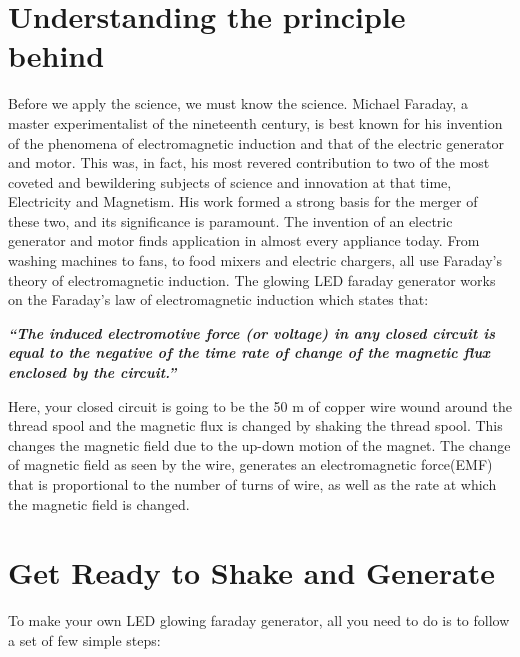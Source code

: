 \section{Understanding the principle behind}
Before we apply the science, we must know the science. Michael Faraday, a
master experimentalist of the nineteenth century, is best known for his invention of the phenomena of electromagnetic induction and that of the electric
generator and motor. This was, in fact, his most revered contribution to two
of the most coveted and bewildering subjects of science and innovation at
that time, Electricity and Magnetism. His work formed a strong basis for the
merger of these two, and its significance is paramount. The invention of an
electric generator and motor finds application in almost every appliance today.
From washing machines to fans, to food mixers and electric chargers, all use
Faraday’s theory of electromagnetic induction. The glowing LED faraday
generator works on the Faraday’s law of electromagnetic induction which
states that:

\textbf{\emph{“The induced electromotive force (or voltage) in any closed circuit is
equal to the negative of the time rate of change of the magnetic flux
enclosed by the circuit.”}}

Here, your closed circuit is going to be the 50 m of copper wire wound
around the thread spool and the magnetic flux is changed by shaking the
thread spool. This changes the magnetic field due to the up-down motion of
the magnet. The change of magnetic field as seen by the wire, generates an
electromagnetic force(EMF) that is proportional to the number of turns of
wire, as well as the rate at which the magnetic field is changed.

\section{Get Ready to Shake and Generate}
To make your own LED glowing faraday generator, all you need to do is to
follow a set of few simple steps:

